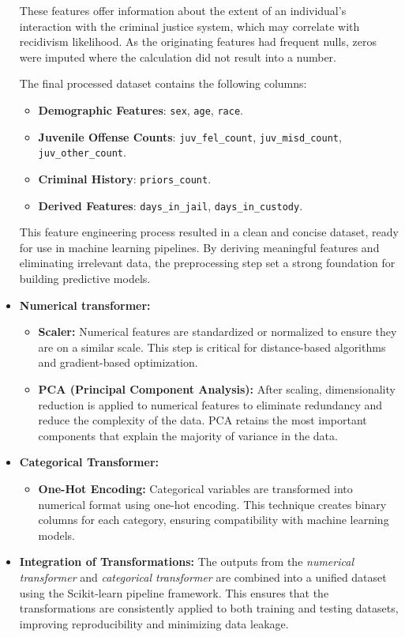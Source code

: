 \begin{itemize}
	These features offer information about the extent of an individual’s interaction with the criminal justice system, which may correlate with recidivism likelihood. As the originating features  had frequent nulls, zeros were imputed where the calculation did not result into a number.
	
	The final processed dataset contains the following columns:
	\begin{itemize}
		\item \textbf{Demographic Features}: \texttt{sex}, \texttt{age}, \texttt{race}.
		\item \textbf{Juvenile Offense Counts}: \texttt{juv\_fel\_count}, \texttt{juv\_misd\_count}, \texttt{juv\_other\_count}.
		\item \textbf{Criminal History}: \texttt{priors\_count}.
		\item \textbf{Derived Features}: \texttt{days\_in\_jail}, \texttt{days\_in\_custody}.
	\end{itemize}
	
	This feature engineering process resulted in a clean and concise dataset, ready for use in machine learning pipelines. By deriving meaningful features and eliminating irrelevant data, the preprocessing step set a strong foundation for building predictive models.
	
	
	\item \textbf{Numerical transformer:}
	\begin{itemize}
		\item \textbf{Scaler:} Numerical features are standardized or normalized to ensure they are on a similar scale. This step is critical for distance-based algorithms and gradient-based optimization.
		\item \textbf{PCA (Principal Component Analysis):} After scaling, dimensionality reduction is applied to numerical features to eliminate redundancy and reduce the complexity of the data. PCA retains the most important components that explain the majority of variance in the data.
	\end{itemize}
	
	\item \textbf{Categorical Transformer:}
	\begin{itemize}
		\item \textbf{One-Hot Encoding:} Categorical variables are transformed into numerical format using one-hot encoding. This technique creates binary columns for each category, ensuring compatibility with machine learning models.
	\end{itemize}
	
	\item \textbf{Integration of Transformations:}
	The outputs from the \textit{numerical transformer} and \textit{categorical transformer} are combined into a unified dataset using the Scikit-learn pipeline framework. This ensures that the transformations are consistently applied to both training and testing datasets, improving reproducibility and minimizing data leakage.
\end{itemize}

